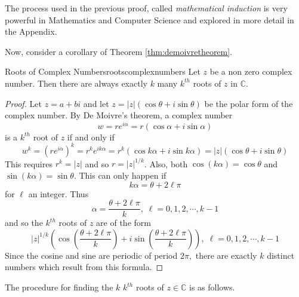 The process used in the previous proof, called {\em mathematical
induction\em} is very powerful in Mathematics and Computer Science
and explored in more detail in the Appendix.

Now, consider a corollary of Theorem \ref{thm:demoivretheorem}.

\begin{corollary}{Roots of Complex Numbers}{rootscomplexnumbers}
Let $z$ be a non zero complex number.
Then there are always exactly $k$ many  $k^{th}$
roots of $z$ in $\mathbb{C}$.
\end{corollary}

\begin{proof}
Let $z=a+bi$ and let $z=\left\vert z\right\vert \left( \cos
\theta+i\sin \theta\right) $ be the polar form of the complex number. By De Moivre's
theorem, a complex number
\begin{equation*}
w= r e^{i \alpha} = r\left( \cos \alpha +i\sin \alpha \right) 
\end{equation*}
is a $k^{th}$ root of $z$ if and only if
\begin{equation*}
w^k = (r e^{i \alpha})^k = r^k e^{ik\alpha} = r^{k}\left( \cos k\alpha +i\sin k\alpha \right) =\left\vert z\right\vert
\left( \cos \theta+i\sin \theta\right) 
\end{equation*}
This requires $r^{k}=\left\vert z\right\vert $ and so $r=\left\vert
z\right\vert ^{1/k}$. Also, both $\cos \left( k\alpha \right) =\cos \theta$ and
$\sin \left( k\alpha \right) =\sin \theta.$ This can only happen if
\begin{equation*}
k\alpha =\theta+2 \ell \pi
\end{equation*}
for $\ell$ an integer. Thus
\begin{equation*}
\alpha =
\frac{\theta+2 \ell \pi }{k},\; \ell = 0, 1, 2, \cdots, k-1 
\end{equation*}
and so the $k^{th}$ roots of $z$ are of the form
\begin{equation*}
\left\vert z\right\vert ^{1/k}\left( \cos \left( \frac{\theta+2 \ell \pi }{k}\right)
+i\sin \left( \frac{\theta+2 \ell \pi }{k}\right) \right) ,\;\ell = 0, 1, 2, \cdots, k-1 
\end{equation*}
Since the cosine and sine are periodic of period $2\pi ,$ there are exactly $
k$ distinct numbers which result from this formula. 
\end{proof}

The procedure for finding the $k$ $k^{th}$ roots of $z \in \mathbb{C}$ is as follows.

